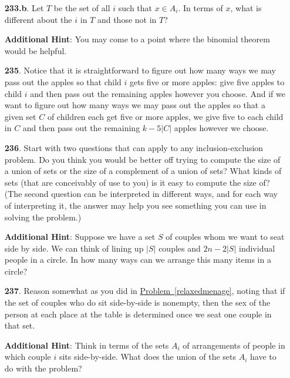 \documentclass[10pt,]{book}
\theoremstyle{plain}
\theoremstyle{definition}
\theoremstyle{definition}
\numberwithin{equation}{chapter}
\begin{document}
\begin{itemize}[itemsep=1em]
\item[\textbf{233.b}.]\hypertarget{p-1358}{}%
Let \(T\) be the set of all \(i\) such that \(x \in A_i\). In terms of \(x\), what is different about the \(i\) in \(T\) and those not in \(T\)?%

\par\smallskip
\noindent\textbf{Additional Hint}: \hypertarget{p-1359}{}%
You may come to a point where the binomial theorem would be helpful.%

\item[\textbf{235}.]\hypertarget{p-1371}{}%
Notice that it is straightforward to figure out how many ways we may pass out the apples so that child \(i\) gets five or more apples: give five apples to child \(i\) and then pass out the remaining apples however you choose. And if  we want to figure out how many ways we may pass out the apples so that a given set \(C\) of children each get five or more apples, we give five to each child in \(C\) and then pass out the remaining \(k-5|C|\) apples however we choose.%

\item[\textbf{236}.]\hypertarget{p-1374}{}%
Start with two questions that can apply to any inclusion-exclusion problem. Do you think you would be better off trying to compute the size of a union of sets or the size of a complement of a union of sets? What kinds of sets (that are conceivably of use to you) is it easy to compute the size of? (The second question can be interpreted in different ways, and for each way of interpreting it, the answer may help you see something you can use in solving the problem.)%

\par\smallskip
\noindent\textbf{Additional Hint}: \hypertarget{p-1375}{}%
Suppose we have a set \(S\) of couples whom we want to seat side by side. We can think of lining up \(|S|\) couples and \(2n - 2|S|\) individual people in a circle.  In how many ways can we arrange this many items in a circle?%

\item[\textbf{237}.]\hypertarget{p-1378}{}%
Reason somewhat as you did in \hyperref[relaxedmenage]{Problem~\ref{relaxedmenage}}, noting that if the set of couples who do sit side-by-side is nonempty, then the sex of the person at each place at the table is determined once we seat one couple in that set.%

\par\smallskip
\noindent\textbf{Additional Hint}: \hypertarget{p-1379}{}%
Think in terms of the sets \(A_i\) of arrangements of people in which couple \(i\) sits side-by-side. What does the union of the sets \(A_i\) have to do with the problem?%


\end{itemize}
\end{document}

